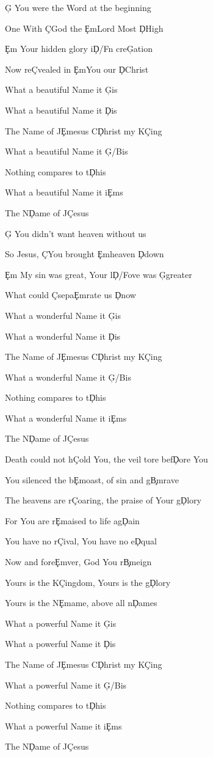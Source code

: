 \documentclass[9pt]{extarticle}
\begin{document}
\bsong

\bv
\c{G} You were the Word at the beginning

One With \c{C}God the \c{Em}Lord Most \c{D}High

\c{Em} Your hidden glory i\c{D/F\s }n cre\c{G}ation

Now re\c{C}vealed in \c{Em}You our \c{D}Christ
\ev

\bc
What a beautiful Name it \c{G}is

What a beautiful Name it \c{D}is

The Name of J\c{Em}esus C\c{D}hrist my K\c{C}ing

What a beautiful Name it \c{G/B}is

Nothing compares to t\c{D}his

What a beautiful Name it i\c{Em}s

The N\c{D}ame of J\c{C}esus
\ec

\bv
\c{G} You didn't want heaven without us

So Jesus, \c{C}You brought \c{Em}heaven \c{D}down

\c{Em} My sin was great, Your l\c{D/F\s }ove was \c{G}greater

What could \c{C}sepa\c{Em}rate us \c{D}now
\ev

\bc
What a wonderful Name it \c{G}is

What a wonderful Name it \c{D}is

The Name of J\c{Em}esus C\c{D}hrist my K\c{C}ing

What a wonderful Name it \c{G/B}is

Nothing compares to t\c{D}his

What a wonderful Name it i\c{Em}s

The N\c{D}ame of J\c{C}esus
\ec

\bb
Death could not h\c{C}old You, the veil tore bef\c{D}ore You

You silenced the b\c{Em}oast, of sin and g\c{Bm}rave

The heavens are r\c{C}oaring, the praise of Your g\c{D}lory

For You are r\c{Em}aised to life ag\c{D}ain
\eb

\bb
You have no r\c{C}ival, You have no e\c{D}qual

Now and fore\c{Em}ver, God You r\c{Bm}eign

Yours is the K\c{C}ingdom, Yours is the g\c{D}lory

Yours is the N\c{Em}ame, above all n\c{D}ames
\eb

\bc
What a powerful Name it \c{G}is

What a powerful Name it \c{D}is

The Name of J\c{Em}esus C\c{D}hrist my K\c{C}ing

What a powerful Name it \c{G/B}is

Nothing compares to t\c{D}his

What a powerful Name it i\c{Em}s

The N\c{D}ame of J\c{C}esus
\ec



\esong
\end{document}
